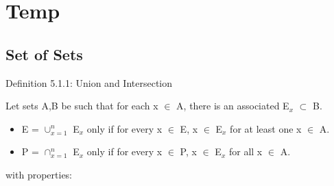 \newpage
\section[Day 5: ]{Temp}

\subsection{ Set of Sets } 

{ \color{blue} Definition 5.1.1: Union and Intersection } 

	\begin{adjustbox}{minipage=14cm, right}
		Let sets A,B be such that for each x $\in$ A, there is an associated E$_x$ $\subset$ B.
		\begin{itemize}[leftmargin=1cm]
			\item E = $\cup_{x=1}^{n}$ E$_x$ only if for every x $\in$ E, x $\in$ E$_x$ for
				at least one x $\in$ A.

			\item P = $\cap_{x=1}^{n}$ E$_x$ only if for every x $\in$ P, x $\in$ E$_x$ for
				all x $\in$ A.
		\end{itemize}
		with properties:
	\end{adjustbox}

